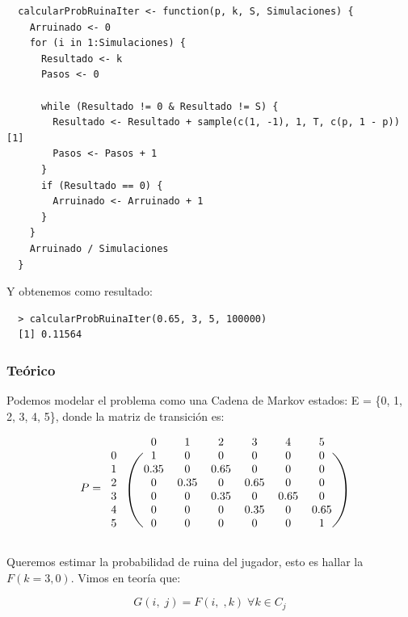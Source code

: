 \documentclass[11pt]{article}
\begin{document}
\begin{verbatim}
  calcularProbRuinaIter <- function(p, k, S, Simulaciones) {
    Arruinado <- 0
    for (i in 1:Simulaciones) {
      Resultado <- k
      Pasos <- 0

      while (Resultado != 0 & Resultado != S) {
        Resultado <- Resultado + sample(c(1, -1), 1, T, c(p, 1 - p))[1]
        Pasos <- Pasos + 1
      }
      if (Resultado == 0) {
        Arruinado <- Arruinado + 1
      }
    }
    Arruinado / Simulaciones
  }
\end{verbatim}

Y obtenemos como resultado:

\begin{verbatim}
  > calcularProbRuinaIter(0.65, 3, 5, 100000)
  [1] 0.11564
\end{verbatim}

\subsubsection*{Teórico}

Podemos modelar el problema como una Cadena de Markov estados: E = \{0, 1, 2, 3, 4, 5\},
donde la matriz de transición es:

\begin{equation*}
  P = 
  \begin{blockarray}{cccccccc}
     & & 0 & 1 & 2 & 3 & 4 & 5 \\
    \begin{block}{cc(cccccc)}
      0 & & 1    & 0    & 0    & 0    & 0    & 0 \\
      1 & & 0.35 & 0    & 0.65 & 0    & 0    & 0 \\
      2 & & 0    & 0.35 & 0    & 0.65 & 0    & 0 \\
      3 & & 0    & 0    & 0.35 & 0    & 0.65 & 0 \\
      4 & & 0    & 0    & 0    & 0.35 & 0    & 0.65 \\
      5 & & 0    & 0    & 0    & 0    & 0    & 1 \\
    \end{block}
  \end{blockarray}
\end{equation*}

Queremos estimar la probabilidad de ruina del jugador, esto es hallar la $ F(k = 3, 0) $. 
Vimos en teoría que:

\begin{equation*}
  G(i, \; j) = F(i, \;, k) \; \forall k \in C_j
\end{equation*}
\end{document}
